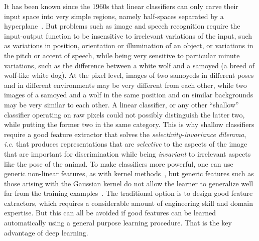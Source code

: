 \documentclass[10pts]{article}
\newcommand{\citep}[1]{\cite{#1}}
\begin{document}
It has been known since the 1960s that linear classifiers can only
carve their input space into very simple regions, namely
half-spaces separated by a hyperplane~\citep{Duda-Hart}.  But problems
such as image and speech recognition require the input-output function
to be insensitive to irrelevant variations of the input, such as
variations in position, orientation or illumination of an object, or
variations in the pitch or accent of speech, while being very sensitive to
particular minute variations, such as the difference between a white
wolf and a samoyed (a breed of wolf-like white dog).  At the pixel
level, images of two samoyeds in different poses and in different
environments may be very different from each other, while two images
of a samoyed and a wolf in the same position and on similar
backgrounds may be very similar to each other. A linear classifier,
or any other ``shallow'' classifier operating on raw pixels could not
possibly distinguish the latter two, while putting the former two in
the same category. This is why shallow classifiers require a good
feature extractor that solves the {\em selectivity-invariance dilemma},
{\it i.e.} that produces representations that are {\em selective} to the
aspects of the image that are important for discrimination while being {\em invariant} to 
irrelevant aspects like the pose of the animal.
%
To make classifiers more powerful, one can use generic non-linear features,
as with kernel methods~\citep{Scholkopf+Smola-2002book}, but generic
features such as those arising with the Gaussian kernel do not allow the learner to
generalize well far from the training examples~\citep{Bengio-localfailure-NIPS-2006-small}.
The traditional option is to design good feature extractors, which requires a considerable amount
of engineering skill and domain expertise. But this can all be avoided if
good features can be learned automatically using a general purpose
learning procedure.  That is the key advantage of deep
learning.
\end{document}
